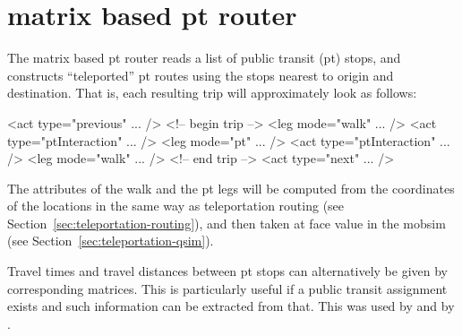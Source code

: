 %


\section{matrix based pt router}
\label{sec:matrix-based-pt-router}

The matrix based pt router reads a list of public transit (pt) stops, and constructs ``teleported'' pt routes using the stops nearest to origin and destination.  That is, each resulting trip will approximately look as follows:
\begin{xml}
<act type="previous" ... />
<!-- begin trip -->
<leg mode="walk" ... />
<act type="ptInteraction" ... />
<leg mode="pt" ... />
<act type="ptInteraction" ... />
<leg mode="walk" ... />
<!-- end trip -->
<act type="next" ... />  
\end{xml}

The attributes of the walk and the pt legs will be computed from the coordinates of the locations in the same way as teleportation routing (see Section~\ref{sec:teleportation-routing}), and then taken at face value in the \gls{mobsim} (see Section~\ref{sec:teleportation-qsim}).

Travel times and travel distances between pt stops can alternatively be given by corresponding matrices.  This is particularly useful if a public transit assignment exists and such information can be extracted from that.  This was used by \citet{RoederNagel2013SketchPlanningBrussels} and by \citet{ZoelligRenner_PhDThesis_2014}.



